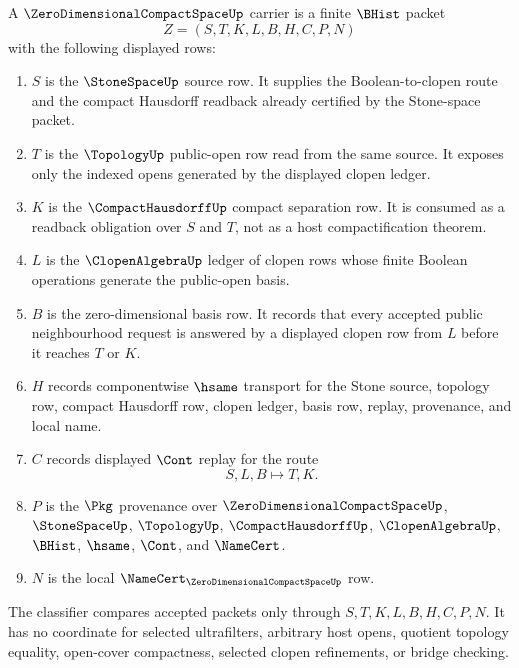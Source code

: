 \begin{definition}
\label{def:zero-dimensional-compact-space-carrier}
A $\ZeroDimensionalCompactSpaceUp$ carrier is a finite $\BHist$ packet
$$
Z=(S,T,K,L,B,H,C,P,N)
$$
with the following displayed rows:
\begin{enumerate}
\item $S$ is the $\StoneSpaceUp$ source row. It supplies the Boolean-to-clopen route and the compact Hausdorff readback already certified by the Stone-space packet.
\item $T$ is the $\TopologyUp$ public-open row read from the same source. It exposes only the indexed opens generated by the displayed clopen ledger.
\item $K$ is the $\CompactHausdorffUp$ compact separation row. It is consumed as a readback obligation over $S$ and $T$, not as a host compactification theorem.
\item $L$ is the $\ClopenAlgebraUp$ ledger of clopen rows whose finite Boolean operations generate the public-open basis.
\item $B$ is the zero-dimensional basis row. It records that every accepted public neighbourhood request is answered by a displayed clopen row from $L$ before it reaches $T$ or $K$.
\item $H$ records componentwise $\hsame$ transport for the Stone source, topology row, compact Hausdorff row, clopen ledger, basis row, replay, provenance, and local name.
\item $C$ records displayed $\Cont$ replay for the route
$$
S,L,B \longmapsto T,K .
$$
\item $P$ is the $\Pkg$ provenance over $\ZeroDimensionalCompactSpaceUp$, $\StoneSpaceUp$, $\TopologyUp$, $\CompactHausdorffUp$, $\ClopenAlgebraUp$, $\BHist$, $\hsame$, $\Cont$, and $\NameCert$.
\item $N$ is the local $\NameCert_{\ZeroDimensionalCompactSpaceUp}$ row.
\end{enumerate}
The classifier compares accepted packets only through $S,T,K,L,B,H,C,P,N$. It has no coordinate for selected ultrafilters, arbitrary host opens, quotient topology equality, open-cover compactness, selected clopen refinements, or bridge checking.
\end{definition}


